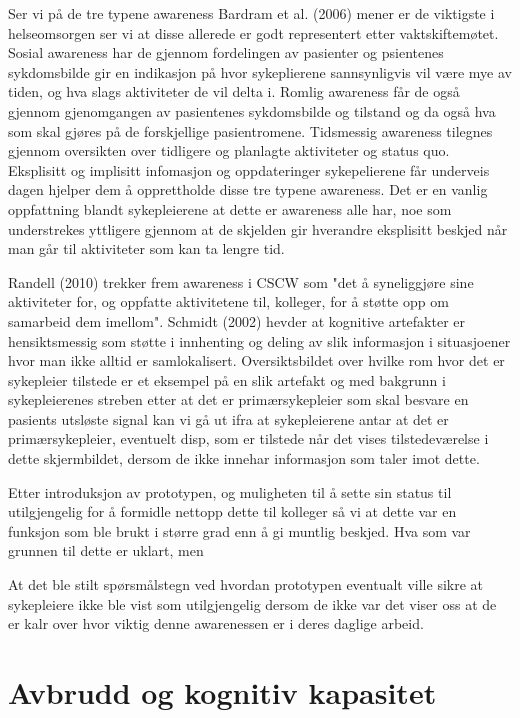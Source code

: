 \noindent
Ser vi på de tre typene awareness Bardram et al. (2006) mener er de viktigste i helseomsorgen ser vi at disse allerede er godt representert etter vaktskiftemøtet. Sosial awareness har de gjennom fordelingen av pasienter og psientenes sykdomsbilde gir en indikasjon på hvor sykeplierene sannsynligvis vil være mye av tiden, og hva slags aktiviteter de vil delta i. Romlig awareness får de også gjennom gjenomgangen av pasientenes sykdomsbilde og tilstand og da også hva som skal gjøres på de forskjellige pasientromene. Tidsmessig awareness tilegnes gjennom oversikten over tidligere og planlagte aktiviteter og status quo. Eksplisitt og implisitt infomasjon og oppdateringer sykepelierene får underveis dagen hjelper dem å opprettholde disse tre typene awareness. Det er en vanlig oppfattning blandt sykepleierene at dette er awareness alle har, noe som understrekes yttligere gjennom at de skjelden gir hverandre eksplisitt beskjed når man går til aktiviteter som kan ta lengre tid. 

\noindent
Randell (2010) trekker frem awareness i CSCW som "det å syneliggjøre sine aktiviteter for, og oppfatte aktivitetene til, kolleger, for å støtte opp om samarbeid dem imellom". Schmidt (2002) hevder at kognitive artefakter er hensiktsmessig som støtte i innhenting og deling av slik informasjon i situasjoener hvor man ikke alltid er samlokalisert. Oversiktsbildet over hvilke rom hvor det er sykepleier tilstede er et eksempel på en slik artefakt og med bakgrunn i sykepleierenes streben etter at det er primærsykepleier som skal besvare en pasients utsløste signal kan vi gå ut ifra at sykepleierene antar at det er primærsykepleier, eventuelt disp, som er tilstede når det vises tilstedeværelse i dette skjermbildet, dersom de ikke innehar informasjon som taler imot dette.

Etter introduksjon av prototypen, og muligheten til å sette sin status til utilgjengelig
for å formidle nettopp dette til kolleger så vi at dette var en funksjon som ble brukt
i større grad enn å gi muntlig beskjed. Hva som var grunnen til dette er uklart, men 

\noindent
At det ble stilt spørsmålstegn ved hvordan prototypen eventualt ville sikre at sykepleiere ikke ble vist som utilgjengelig dersom de ikke var det viser oss at de er kalr over hvor viktig denne awarenessen er i deres daglige arbeid. 


\section{Avbrudd og kognitiv kapasitet}



